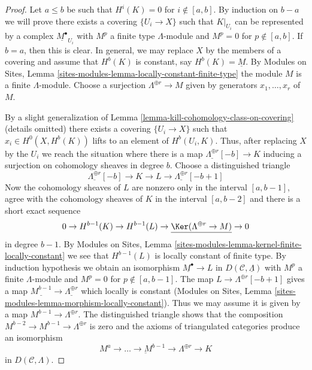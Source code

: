 \begin{proof}
Let $a \leq b$ be such that $H^i(K) = 0$ for $i \not \in [a, b]$.
By induction on $b - a$ we will prove there exists a covering
$\{U_i \to X\}$ such that $K|_{U_i}$ can be represented by a complex
$\underline{M^\bullet}_{U_i}$ with $M^p$ a finite type $\Lambda$-module
and $M^p = 0$ for $p \not \in [a, b]$. If $b = a$, then
this is clear. In general, we may replace $X$ by the members
of a covering and assume that $H^b(K)$ is constant, say
$H^b(K) = \underline{M}$. By Modules on Sites, Lemma
\ref{sites-modules-lemma-locally-constant-finite-type}
the module $M$ is a finite $\Lambda$-module. Choose a surjection
$\Lambda^{\oplus r} \to M$ given by generators $x_1, \ldots, x_r$
of $M$.

\medskip\noindent
By a slight generalization of
Lemma \ref{lemma-kill-cohomology-class-on-covering} (details omitted)
there exists a covering $\{U_i \to X\}$ such that $x_i \in H^0(X, H^b(K))$
lifts to an element of $H^b(U_i, K)$. Thus, after replacing $X$ by the
$U_i$ we reach the situation where there is a map
$\underline{\Lambda^{\oplus r}}[-b] \to K$
inducing a surjection on cohomology sheaves in degree $b$.
Choose a distinguished triangle
$$
\underline{\Lambda^{\oplus r}}[-b] \to K \to L \to
\underline{\Lambda^{\oplus r}}[-b + 1]
$$
Now the cohomology sheaves of $L$ are nonzero only in the interval
$[a, b - 1]$, agree with the cohomology sheaves of $K$ in the interval
$[a, b - 2]$ and there is a short exact sequence
$$
0 \to H^{b - 1}(K) \to H^{b - 1}(L) \to
\underline{\Ker(\Lambda^{\oplus r} \to M)} \to 0
$$
in degree $b - 1$. By
Modules on Sites, Lemma
\ref{sites-modules-lemma-kernel-finite-locally-constant}
we see that $H^{b - 1}(L)$ is locally constant of finite type.
By induction hypothesis we obtain an isomorphism
$\underline{M^\bullet} \to L$ in $D(\mathcal{C}, \underline{\Lambda})$
with $M^p$ a finite $\Lambda$-module and $M^p = 0$ for
$p \not \in [a, b - 1]$. The map $L \to \Lambda^{\oplus r}[-b + 1]$
gives a map $\underline{M^{b - 1}} \to \underline{\Lambda^{\oplus r}}$
which locally is constant
(Modules on Sites, Lemma
\ref{sites-modules-lemma-morphism-locally-constant}).
Thus we may assume it is given by a map $M^{b - 1} \to \Lambda^{\oplus r}$.
The distinguished triangle shows that the composition
$M^{b - 2} \to M^{b - 1} \to \Lambda^{\oplus r}$ is zero
and the axioms of triangulated categories produce an isomorphism
$$
\underline{M^a \to \ldots \to M^{b - 1} \to \Lambda^{\oplus r}}
\longrightarrow K
$$
in $D(\mathcal{C}, \Lambda)$.
\end{proof}

